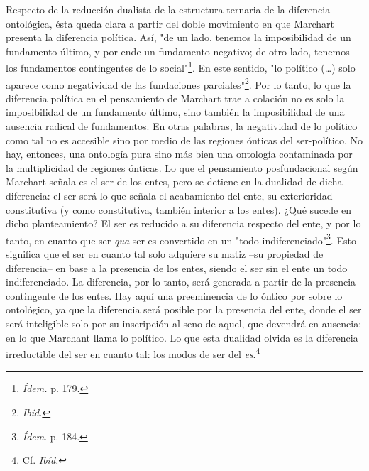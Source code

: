 \documentclass{book}
\begin{document}
Respecto de la reducción dualista de la estructura ternaria de la
diferencia ontológica, ésta queda clara a partir del doble movimiento en
que Marchart presenta la diferencia política. Así, "de un lado, tenemos
la imposibilidad de un fundamento último, y por ende un fundamento
negativo; de otro lado, tenemos los fundamentos contingentes de lo
social"\footnote{\emph{Ídem.} p. 179.}. En este sentido, "lo político
(\dots) solo aparece como negatividad de las fundaciones
parciales"\footnote{\emph{Ibíd.}}. Por lo tanto, lo que la diferencia
política en el pensamiento de Marchart trae a colación no es solo la
imposibilidad de un fundamento último, sino también la imposibilidad de
una ausencia radical de fundamentos. En otras palabras, la negatividad
de lo político como tal no es accesible sino por medio de las regiones
ónticas del ser-político. No hay, entonces, una ontología pura sino más
bien una ontología contaminada por la multiplicidad de regiones ónticas.
Lo que el pensamiento posfundacional según Marchart señala es el ser de
los entes, pero se detiene en la dualidad de dicha diferencia: el ser
será lo que señala el acabamiento del ente, su exterioridad constitutiva
(y como constitutiva, también interior a los entes). ¿Qué sucede en
dicho planteamiento? El ser es reducido a su diferencia respecto del
ente, y por lo tanto, en cuanto que ser-\emph{qua}-ser es convertido en
un "todo indiferenciado"\footnote{\emph{Ídem}. p. 184.}. Esto significa
que el ser en cuanto tal solo adquiere su matiz --su propiedad de
diferencia-- en base a la presencia de los entes, siendo el ser sin el
ente un todo indiferenciado. La diferencia, por lo tanto, será generada
a partir de la presencia contingente de los entes. Hay aquí una
preeminencia de lo óntico por sobre lo ontológico, ya que la diferencia
será posible por la presencia del ente, donde el ser será inteligible
solo por su inscripción al seno de aquel, que devendrá en ausencia: en
lo que Marchant llama lo político. Lo que esta dualidad olvida es la
diferencia irreductible del ser en cuanto tal: los modos de ser del
\emph{es}.\footnote{Cf. \emph{Ibíd.}}
\end{document}
